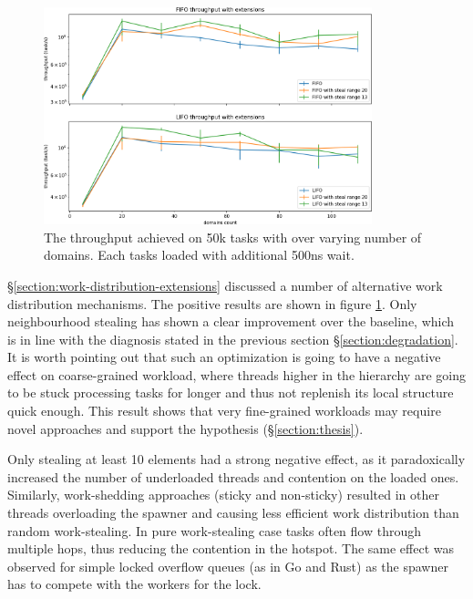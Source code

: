 \documentclass[12pt,a4paper,twoside]{report}
\begin{document}
\begin{figure} 
     \centering
     \includegraphics[width=0.85\textwidth]{eval/packet-basic-distribution10-granular.png}
     \caption{The throughput achieved on 50k tasks with over varying number of domains. Each tasks loaded with additional 500ns wait.}
    \label{fig:packet-extenstions}
\end{figure}


\S\ref{section:work-distribution-extensions} discussed a number of alternative work distribution mechanisms. The positive results are shown in figure \ref{fig:packet-extenstions}. Only neighbourhood stealing has shown a clear improvement over the baseline, which is in line with the diagnosis stated in the previous section \S\ref{section:degradation}. It is worth pointing out that such an optimization is going to have a negative effect on coarse-grained workload, where threads higher in the hierarchy are going to be stuck processing tasks for longer and thus not replenish its local structure quick enough. This result shows that very fine-grained workloads may require novel approaches and support the hypothesis (\S\ref{section:thesis}).

\label{paragraph:overflow-queue-bad-1}
Only stealing at least 10 elements had a strong negative effect, as it paradoxically increased the number of underloaded threads and contention on the loaded ones. Similarly, work-shedding approaches (sticky and non-sticky) resulted in other threads overloading the spawner and causing less efficient work distribution than random work-stealing. In pure work-stealing case tasks often flow through multiple hops, thus reducing the contention in the hotspot. The same effect was observed for simple locked overflow queues (as in Go and Rust) as the spawner has to compete with the workers for the lock.
\end{document}
